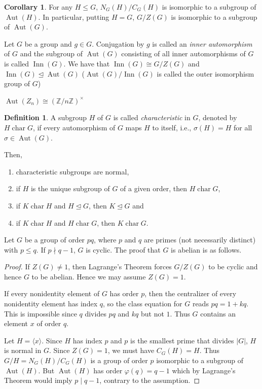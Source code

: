 \documentclass{article}
\DeclareMathOperator{\Aut}{Aut}
\DeclareMathOperator{\Inn}{Inn}
\numberwithin{equation}{section}
\theoremstyle{definition}
\newtheorem{corollary}[theorem]{Corollary}
\newtheorem{definition}{Definition}
\numberwithin{definition}{section}
\numberwithin{theorem}{section}
\theoremstyle{remark}
\numberwithin{exercise}{section}
\begin{document}
    \begin{corollary}
    For any $H\leq G$, $N_G(H)/C_G(H)$ is isomorphic to a subgroup of $\Aut(H)$. In particular, putting $H=G$, $G/Z(G)$ is isomorphic to a subgroup of $\Aut(G)$.
    \end{corollary}
    
    Let $G$ be a group and $g\in G$. Conjugation by $g$ is called an \textit{inner automorphism} of $G$ and the subgroup of $\Aut(G)$ consisting of all inner automorphisms of $G$ is called $\Inn(G)$. We have that $\Inn(G)\cong G/Z(G)$ and $\Inn(G)\unlhd\Aut(G)$ ($\Aut(G)/\Inn(G)$ is called the outer isomorphism group of $G$)
    
    $\Aut(Z_n)\cong (\mathbb{Z}/n\mathbb{Z})^{\times}$
    
    \begin{definition}
    A subgroup $H$ of $G$ is called \textit{characteristic} in $G$, denoted by $H \operatorname{char} G$, if every automorphism of $G$ maps $H$ to itself, i.e., $\sigma(H)=H$ for all $\sigma\in\Aut(G)$.
    \end{definition}
    
    Then,
    \begin{enumerate}[i]
        \item characteristic subgroups are normal,
        \item if $H$ is the unique subgroup of $G$ of a given order, then $H \operatorname{char} G$,
        \item if $K\operatorname{char} H$ and $H\unlhd G$, then $K\unlhd G$ and
        \item if $K\operatorname{char} H$ and $H\operatorname{char} G$, then $K\operatorname{char} G$.
    \end{enumerate}
    
    Let $G$ be a group of order $pq$, where $p$ and $q$ are primes (not necessarily distinct) with $p\leq q$. If $p\nmid q-1$, $G$ is cyclic. The proof that $G$ is abelian is as follows.
    
    \begin{proof}
    If $Z(G)\neq 1$, then Lagrange's Theorem forces $G/Z(G)$ to be cyclic and hence $G$ to be abelian. Hence we may assume $Z(G)=1$.
    
    If every nonidentity element of $G$ has order $p$, then the centralizer of every nonidentity element has index $q$, so the class equation for $G$ reads $pq = 1 + kq$. This is impossible since $q$ divides $pq$ and $kq$ but not $1$. Thus $G$ contains an element $x$ of order $q$.
    
    Let $H=\langle x\rangle$. Since $H$ has index $p$ and $p$ is the smallest prime that divides $|G|$, $H$ is normal in $G$. Since $Z(G)=1$, we must have $C_G(H)=H$. Thus $G/H=N_G(H)/C_G(H)$ is a group of order $p$ isomorphic to a subgroup of $\Aut(H)$. But $\Aut(H)$ has order $\varphi(q)=q-1$ which by Lagrange's Theorem would imply $p\mid q-1$, contrary to the assumption.
    \end{proof}
    
\end{document}
